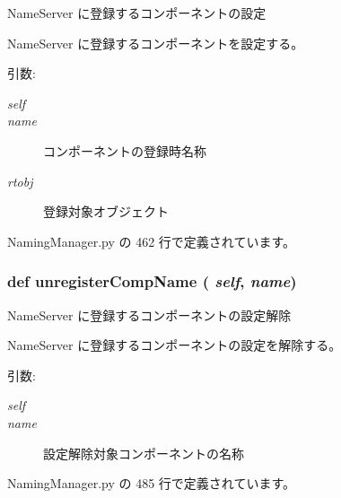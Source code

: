 NameServer に登録するコンポーネントの設定 

NameServer に登録するコンポーネントを設定する。

\begin{Desc}
\item[引数:]
\begin{description}
\item[{\em self}]\item[{\em name}]コンポーネントの登録時名称 \item[{\em rtobj}]登録対象オブジェクト \end{description}
\end{Desc}


 NamingManager.py の 462 行で定義されています。
\subsubsection{\setlength{\rightskip}{0pt plus 5cm}def unregisterCompName ( {\em self},  {\em name})}\label{classsource__py_1_1_naming_manager_1_1_naming_manager_558029b832f71a3bd832349153bfdb37}


NameServer に登録するコンポーネントの設定解除 

NameServer に登録するコンポーネントの設定を解除する。

\begin{Desc}
\item[引数:]
\begin{description}
\item[{\em self}]\item[{\em name}]設定解除対象コンポーネントの名称 \end{description}
\end{Desc}


 NamingManager.py の 485 行で定義されています。